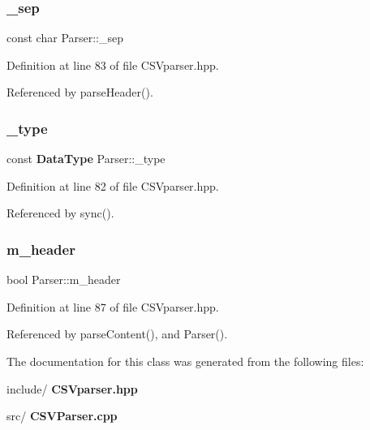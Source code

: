 \subsubsection{\+\_\+sep}
{\footnotesize\ttfamily const char Parser\+::\+\_\+sep\hspace{0.3cm}{\ttfamily [private]}}



Definition at line 83 of file C\+S\+Vparser.\+hpp.



Referenced by parse\+Header().

\mbox{\label{class_parser_a40e8d80f6539cd6170a25d47b9edb20c}} 
\subsubsection{\+\_\+type}
{\footnotesize\ttfamily const \textbf{ Data\+Type} Parser\+::\+\_\+type\hspace{0.3cm}{\ttfamily [private]}}



Definition at line 82 of file C\+S\+Vparser.\+hpp.



Referenced by sync().

\mbox{\label{class_parser_ab0bd343f86055468eb6cbd298dacdc16}} 
\subsubsection{m\+\_\+header}
{\footnotesize\ttfamily bool Parser\+::m\+\_\+header\hspace{0.3cm}{\ttfamily [private]}}



Definition at line 87 of file C\+S\+Vparser.\+hpp.



Referenced by parse\+Content(), and Parser().



The documentation for this class was generated from the following files\+:\begin{DoxyCompactItemize}
\item 
include/\textbf{ C\+S\+Vparser.\+hpp}\item 
src/\textbf{ C\+S\+V\+Parser.\+cpp}\end{DoxyCompactItemize}
